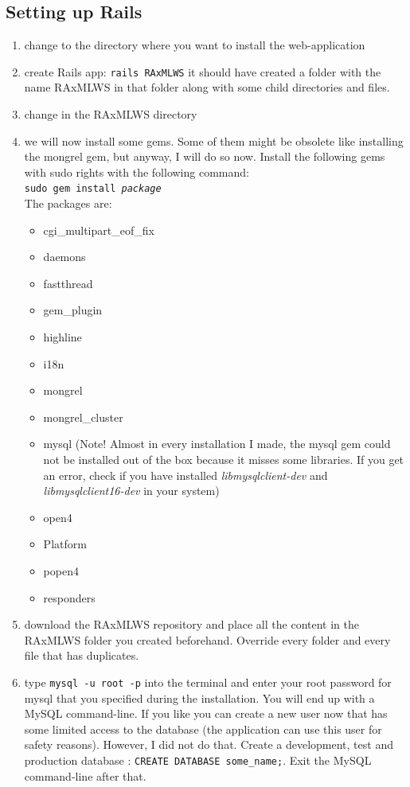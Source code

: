 \documentclass{scrartcl}
\begin{document}
				\subsection{Setting up Rails}
				\begin{enumerate}
				\item change to the directory where you want to install the web-application
				\item create Rails app: \texttt{rails RAxMLWS} it should have created a folder with the name RAxMLWS in that folder along with some child directories and files.
				\item change in the RAxMLWS directory
				\item we will now install some gems. Some of them might be obsolete like installing the mongrel gem, but anyway, I will do so now. Install the following gems with sudo rights with the following command: \\ \texttt{sudo gem install \textit{package}} \\ The packages are:
				\begin{itemize}
				\item cgi\_multipart\_eof\_fix 
				\item daemons
				\item fastthread
				\item gem\_plugin
				\item highline
				\item i18n
				\item mongrel
				\item mongrel\_cluster
				\item mysql (Note! Almost in every installation I made, the mysql gem could not be installed out of the box because it misses some libraries. If you get an error, check if you have installed \textit{libmysqlclient-dev} and \textit{libmysqlclient16-dev} in your system)
				\item open4
				\item Platform
				\item popen4
				\item responders
				\end{itemize}
				\item download the RAxMLWS repository and place all the content in the RAxMLWS folder you created beforehand. Override every folder and every file that has duplicates.
				\item type \texttt{mysql -u root -p} into the terminal and enter your root password for mysql that you specified during the installation. You will end up with a MySQL command-line. If you like you can create a new user now that has some limited access to the database (the application can use this user for safety reasons). However, I did not do that. Create a development, test and production database : \texttt{CREATE DATABASE some\_name;}. Exit the MySQL command-line after that. 

\end{enumerate}
\end{document}
